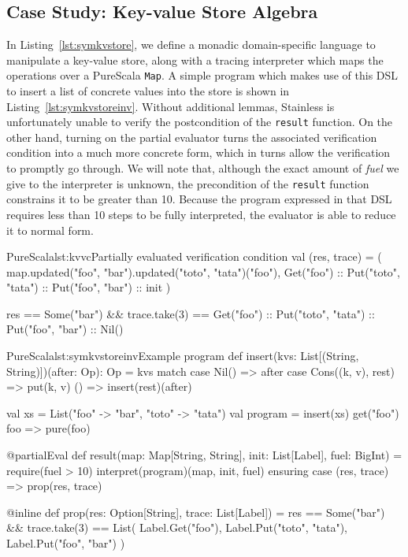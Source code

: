 \documentclass[a4paper,twoside]{article}
\newcommand{\RefCode}[1]{Listing~\ref{#1}}
\newcommand{\stt}[1]{\texttt{\small{#1}}}
\begin{document}
\subsection{Case Study: Key-value Store Algebra}
\label{symcases}

In \RefCode{lst:symkvstore}, we define a monadic domain-specific language to manipulate a key-value store, along with a tracing interpreter which maps the operations over a PureScala \stt{Map}. A simple program which makes use of this DSL to insert a list of concrete values into the store is shown in \RefCode{lst:symkvstoreinv}. Without additional lemmas, Stainless is unfortunately unable to verify the postcondition of the \stt{result} function. On the other hand, turning on the partial evaluator turns the associated verification condition into a much more concrete form, which in turns allow the verification to promptly go through. We will note that, although the exact amount of \textit{fuel} we give to the interpreter is unknown, the precondition of the \stt{result} function constrains it to be greater than 10. Because the program expressed in that DSL requires less than 10 steps to be fully interpreted, the evaluator is able to reduce it to normal form.

\begin{Code}{PureScala}{lst:kvvc}{Partially evaluated verification condition}
val (res, trace) = (
  map.updated("foo", "bar").updated("toto", "tata")("foo"),
  Get("foo") :: Put("toto", "tata") :: Put("foo", "bar") :: init
)

res == Some("bar") &&
trace.take(3) == Get("foo") :: Put("toto", "tata") :: Put("foo", "bar") :: Nil()
\end{Code}

\begin{Code}{PureScala}{lst:symkvstoreinv}{Example program}
def insert(kvs: List[(String, String)])(after: Op): Op = kvs match {
  case Nil() => after
  case Cons((k, v), rest) => put(k, v) { () => insert(rest)(after) }
}

val xs = List("foo" -> "bar", "toto" -> "tata")
val program = insert(xs) {
  get("foo") { foo =>
    pure(foo)
  }
}

@partialEval
def result(map: Map[String, String], init: List[Label], fuel: BigInt) = {
  require(fuel > 10)
  interpret(program)(map, init, fuel)
} ensuring { case (res, trace) => prop(res, trace) }

@inline
def prop(res: Option[String], trace: List[Label]) = {
  res == Some("bar") &&
  trace.take(3) == List(
    Label.Get("foo"),
    Label.Put("toto", "tata"),
    Label.Put("foo", "bar")
  )
}
\end{Code}
\end{document}
